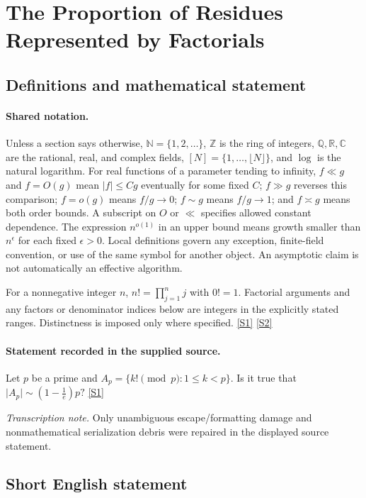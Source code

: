 \documentclass[11pt,a4paper]{article}
\newcommand{\N}{\mathbb{N}}
\newcommand{\Z}{\mathbb{Z}}
\newcommand{\Q}{\mathbb{Q}}
\newcommand{\R}{\mathbb{R}}
\newcommand{\C}{\mathbb{C}}
\newcommand{\sref}[2]{\hyperlink{source:#1:#2}{[S#2]}}
\begin{document}
\section{The Proportion of Residues Represented by Factorials}\label{statement}


\subsection{Definitions and mathematical statement}

\paragraph{Shared notation.}Unless a section says otherwise, $\N=\{1,2,\ldots\}$,
$\Z$ is the ring of integers, $\Q,\R,\C$ are the rational, real, and complex
fields, $[N]=\{1,\ldots,\lfloor N\rfloor\}$, and $\log$ is the natural
logarithm. For real functions of a parameter tending to infinity,
$f\ll g$ and $f=O(g)$ mean $|f|\leq Cg$ eventually for some fixed $C$;
$f\gg g$ reverses this comparison; $f=o(g)$ means $f/g\to0$;
$f\sim g$ means $f/g\to1$; and $f\asymp g$ means both order bounds.
A subscript on $O$ or $\ll$ specifies allowed constant dependence.
The expression $n^{o(1)}$ in an upper bound means growth smaller than
$n^\epsilon$ for each fixed $\epsilon>0$. Local definitions govern any
exception, finite-field convention, or use of the same symbol for another
object. An asymptotic claim is not automatically an effective algorithm.



For a nonnegative integer $n$, $n!=\prod_{j=1}^n j$ with $0!=1$. Factorial arguments and any factors or denominator indices below are integers in the explicitly stated ranges. Distinctness is imposed only where specified. \sref{statement}{1} \sref{statement}{2}

\paragraph{Statement recorded in the supplied source.}
Let $p$ be a prime and $ A_p = \{ k! \pmod{p} : 1\leq k<p\}. $ Is it true that $ \lvert A_p\rvert \sim (1-\tfrac{1}{e})p? $ \sref{statement}{1}

{\small\emph{Transcription note.} Only unambiguous escape/formatting damage and nonmathematical serialization debris were repaired in the displayed source statement.}

\subsection{Short English statement}
\end{document}
